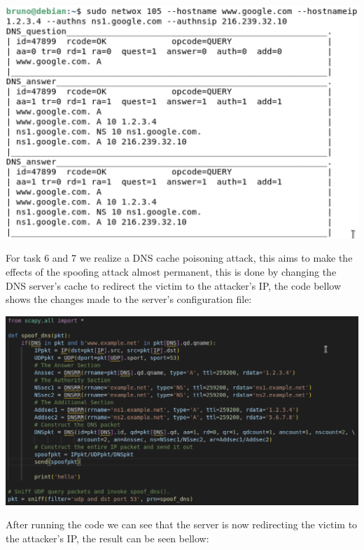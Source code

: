 \documentclass{article}
\begin{document}
\begin{center}
  \includegraphics[scale=0.5]{images/netwox-google.png}
\end{center}

For task 6 and 7 we realize a DNS cache poisoning attack, this aims to make the effects of the spoofing attack almost permanent, this is done by changing the DNS server's cache to redirect the victim to the attacker's IP, the code bellow shows the changes made to the server's configuration file:

\begin{center}
  \includegraphics[scale=0.5]{images/Task7-code.png}
\end{center}

After running the code we can see that the server is now redirecting the victim to the attacker's IP, the result can be seen bellow:
\end{document}
